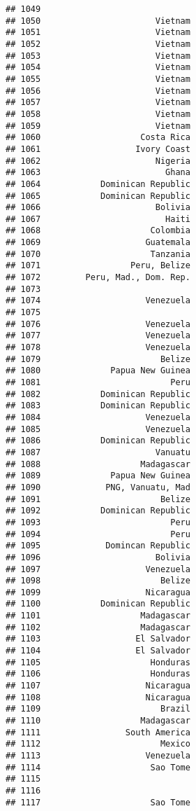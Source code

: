 \documentclass[
]{article}
\begin{document}
\begin{verbatim}
## 1049                              
## 1050                       Vietnam
## 1051                       Vietnam
## 1052                       Vietnam
## 1053                       Vietnam
## 1054                       Vietnam
## 1055                       Vietnam
## 1056                       Vietnam
## 1057                       Vietnam
## 1058                       Vietnam
## 1059                       Vietnam
## 1060                    Costa Rica
## 1061                   Ivory Coast
## 1062                       Nigeria
## 1063                         Ghana
## 1064            Dominican Republic
## 1065            Dominican Republic
## 1066                       Bolivia
## 1067                         Haiti
## 1068                      Colombia
## 1069                     Guatemala
## 1070                      Tanzania
## 1071                  Peru, Belize
## 1072         Peru, Mad., Dom. Rep.
## 1073                              
## 1074                     Venezuela
## 1075                              
## 1076                     Venezuela
## 1077                     Venezuela
## 1078                     Venezuela
## 1079                        Belize
## 1080              Papua New Guinea
## 1081                          Peru
## 1082            Dominican Republic
## 1083            Dominican Republic
## 1084                     Venezuela
## 1085                     Venezuela
## 1086            Dominican Republic
## 1087                       Vanuatu
## 1088                    Madagascar
## 1089              Papua New Guinea
## 1090             PNG, Vanuatu, Mad
## 1091                        Belize
## 1092            Dominican Republic
## 1093                          Peru
## 1094                          Peru
## 1095             Domincan Republic
## 1096                       Bolivia
## 1097                     Venezuela
## 1098                        Belize
## 1099                     Nicaragua
## 1100            Dominican Republic
## 1101                    Madagascar
## 1102                    Madagascar
## 1103                   El Salvador
## 1104                   El Salvador
## 1105                      Honduras
## 1106                      Honduras
## 1107                     Nicaragua
## 1108                     Nicaragua
## 1109                        Brazil
## 1110                    Madagascar
## 1111                 South America
## 1112                        Mexico
## 1113                     Venezuela
## 1114                      Sao Tome
## 1115                              
## 1116                              
## 1117                      Sao Tome

\end{verbatim}
\end{document}

